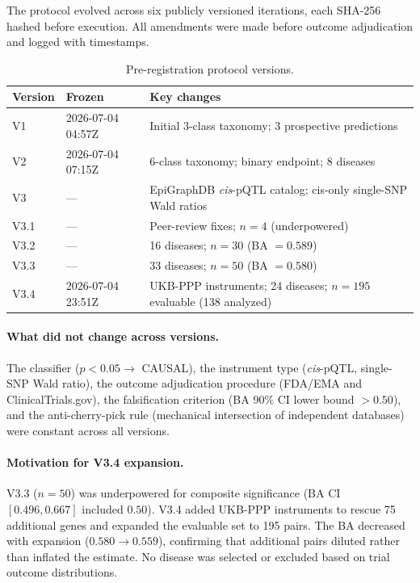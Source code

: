 \documentclass[11pt]{article}
\begin{document}
The protocol evolved across six publicly versioned iterations, each SHA-256 hashed before execution. All amendments were made before outcome adjudication and logged with timestamps.

\vspace{1em}
\begin{table}[h]
\centering
\caption{Pre-registration protocol versions.}
\label{tab:versions}
\small
\begin{tabular}{llp{6.5cm}}
\toprule
Version & Frozen & Key changes \\
\midrule
V1 & 2026-07-04 04:57Z & Initial 3-class taxonomy; 3 prospective predictions \\
V2 & 2026-07-04 07:15Z & 6-class taxonomy; binary endpoint; 8 diseases \\
V3 & --- & EpiGraphDB \emph{cis}-pQTL catalog; cis-only single-SNP Wald ratios \\
V3.1 & --- & Peer-review fixes; $n = 4$ (underpowered) \\
V3.2 & --- & 16 diseases; $n = 30$ (BA $= 0.589$) \\
V3.3 & --- & 33 diseases; $n = 50$ (BA $= 0.580$) \\
V3.4 & 2026-07-04 23:51Z & UKB-PPP instruments; 24 diseases; $n = 195$ evaluable (138 analyzed) \\
\bottomrule
\end{tabular}
\end{table}

\paragraph{What did not change across versions.}
The classifier ($p < 0.05 \rightarrow$ CAUSAL), the instrument type (\emph{cis}-pQTL, single-SNP Wald ratio), the outcome adjudication procedure (FDA/EMA and ClinicalTrials.gov), the falsification criterion (BA 90\% CI lower bound $> 0.50$), and the anti-cherry-pick rule (mechanical intersection of independent databases) were constant across all versions.

\paragraph{Motivation for V3.4 expansion.}
V3.3 ($n = 50$) was underpowered for composite significance (BA CI $[0.496, 0.667]$ included $0.50$). V3.4 added UKB-PPP instruments to rescue 75 additional genes and expanded the evaluable set to 195 pairs. The BA decreased with expansion ($0.580 \rightarrow 0.559$), confirming that additional pairs diluted rather than inflated the estimate. No disease was selected or excluded based on trial outcome distributions.
\end{document}
